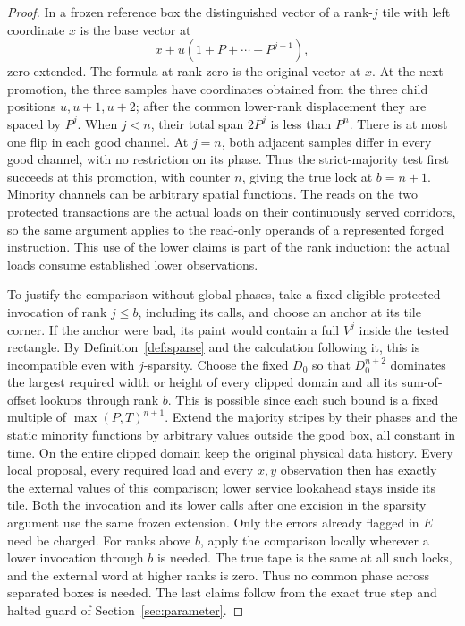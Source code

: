 \begin{proof}
In a frozen reference box the distinguished vector of a rank-\(j\) tile with left coordinate \(x\) is the base vector at
\[
x+u(1+P+\cdots+P^{j-1}),
\]
zero extended. The formula at rank zero is the original vector at \(x\). At the next promotion, the three samples have coordinates obtained from the three child positions \(u,u+1,u+2\); after the common lower-rank displacement they are spaced by \(P^j\). When \(j<n\), their total span \(2P^j\) is less than \(P^n\). There is at most one flip in each good channel. At \(j=n\), both adjacent samples differ in every good channel, with no restriction on its phase. Thus the strict-majority test first succeeds at this promotion, with counter \(n\), giving the true lock at \(b=n+1\). Minority channels can be arbitrary spatial functions. The reads on the two protected transactions are the actual loads on their continuously served corridors, so the same argument applies to the read-only operands of a represented forged instruction. This use of the lower claims is part of the rank induction: the actual loads consume established lower observations.

To justify the comparison without global phases, take a fixed eligible protected invocation of rank \(j\le b\), including its calls, and choose an anchor at its tile corner. If the anchor were bad, its paint would contain a full \(V^j\) inside the tested rectangle. By Definition~\ref{def:sparse} and the calculation following it, this is incompatible even with \(j\)-sparsity. Choose the fixed \(D_0\) so that \(D_0^{n+2}\) dominates the largest required width or height of every clipped domain and all its sum-of-offset lookups through rank \(b\). This is possible since each such bound is a fixed multiple of \(\max(P,T)^{n+1}\). Extend the majority stripes by their phases and the static minority functions by arbitrary values outside the good box, all constant in time. On the entire clipped domain keep the original physical data history. Every local proposal, every required load and every \(x,y\) observation then has exactly the external values of this comparison; lower service lookahead stays inside its tile. Both the invocation and its lower calls after one excision in the sparsity argument use the same frozen extension. Only the errors already flagged in \(E\) need be charged. For ranks above \(b\), apply the comparison locally wherever a lower invocation through \(b\) is needed. The true tape is the same at all such locks, and the external word at higher ranks is zero. Thus no common phase across separated boxes is needed. The last claims follow from the exact true step and halted guard of Section~\ref{sec:parameter}.
\end{proof}

